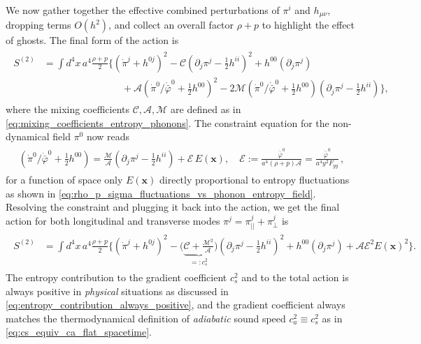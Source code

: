 We now gather together the effective combined perturbations of $\pi^i$ and $h_{\mu\nu}$, dropping terms $O(h^2)$, and collect an overall factor $\rho+p$ to highlight the effect of ghosts.
The final form of the action is 
{\small\begin{align}\label{eq:quadrati_action_final_with_entropy_field}
\begin{aligned}
     S^{(2)}&=\int\! d^4x\, a^4\frac{\rho+p}{2}\bigg\{
    (\dot{\pi}^j+h^{0j})^2 -\mathcal{C}(\partial_j \pi^j-\tfrac12 h^{ii})^2 + h^{00} (\partial_j\pi^j)\\[2.5pt]
    &\qquad\qquad\qquad \qquad + \mathcal{A} (\dot{\pi}^0/\dot{\bar{\varphi}}^0+\tfrac12 h^{00})^2 - 2\mathcal{M}(\dot{\pi}^0/\dot{\bar{\varphi}}^0+\tfrac12 h^{00}) (\partial_j \pi^j-\tfrac12 h^{ii}) \bigg\},
\end{aligned}
\end{align}}
where the mixing coefficients $\mathcal{C},\mathcal{A},\mathcal{M}$ are defined as in \eqref{eq:mixing_coefficients_entropy_phonons}.
%
The constraint equation for the non-dynamical field $\pi^0$ now reads
{\small\begin{align}\label{eq:integrate_out_entropy_curved_spactime}
\begin{aligned}
     (\dot{\pi}^0/\dot{\bar{\varphi}}^0+\tfrac12 h^{00}) = \frac{\mathcal{M}}{\mathcal{A}}(\partial_j \pi^j-\tfrac12 h^{ii}) + \mathcal{E}\,{E(\mathbf{x})},\quad \mathcal{E}:=\frac{\dot{\bar{\varphi}}^0}{a^4(\rho+p)\mathcal{A}} = \frac{\dot{\bar{\varphi}}^0}{a^4 y^2 F_{yy}}\,,
\end{aligned}
\end{align}}
for a function of space only $E(\mathbf{x})$ directly proportional to entropy fluctuations as shown in \eqref{eq:rho_p_sigma_fluctuations_vs_phonon_entropy_field}.
Resolving the constraint and plugging it back into the action, we get the final action for both longitudinal and transverse modes $\pi^j=\pi^j_{||}+\pi^j_{\perp}$ is
{\small\begin{align}\label{eq:quadrati_action_final_integrated_out_entropy_field}
\begin{aligned}
     S^{(2)}&\!=\!\int\!\! d^4\!x\, a^4\frac{\rho+p}{2}\bigg\{
    (\dot{\pi}^j+h^{0j})^2\!-\!\big(\underbrace{\mathcal{C}+\tfrac{\mathcal{M}^2}{\mathcal{A}}}_{=:c_s^2}\big)(\partial_j \pi^j-\tfrac12 h^{ii})^2 \!+ h^{00} (\partial_j\pi^j) + \mathcal{A}\mathcal{E}^2 E(\mathbf{x})^2\bigg\}.
\end{aligned}
\end{align}}
The entropy contribution to the gradient coefficient $c_s^2$ and to the total action is always positive in \emph{physical} situations as discussed in \eqref{eq:entropy_contribution_always_positive}, and the gradient coefficient always matches the thermodynamical definition of \emph{adiabatic} sound speed $c_a^2\equiv c_s^2$ as in \eqref{eq:cs_equiv_ca_flat_spacetime}.

